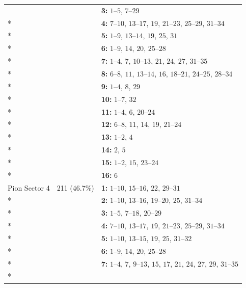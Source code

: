 \begin{longtable}{p{3.5cm}p{2.2cm}p{8.3cm}}
 &  & \textbf{3:} \mbox{$1$--$5$}, \mbox{$7$--$29$} \\*
 &  & \textbf{4:} \mbox{$7$--$10$}, \mbox{$13$--$17$}, \mbox{$19$}, \mbox{$21$--$23$}, \mbox{$25$--$29$}, \mbox{$31$--$34$} \\*
 &  & \textbf{5:} \mbox{$1$--$9$}, \mbox{$13$--$14$}, \mbox{$19$}, \mbox{$25$}, \mbox{$31$} \\*
 &  & \textbf{6:} \mbox{$1$--$9$}, \mbox{$14$}, \mbox{$20$}, \mbox{$25$--$28$} \\*
 &  & \textbf{7:} \mbox{$1$--$4$}, \mbox{$7$}, \mbox{$10$--$13$}, \mbox{$21$}, \mbox{$24$}, \mbox{$27$}, \mbox{$31$--$35$} \\*
 &  & \textbf{8:} \mbox{$6$--$8$}, \mbox{$11$}, \mbox{$13$--$14$}, \mbox{$16$}, \mbox{$18$--$21$}, \mbox{$24$--$25$}, \mbox{$28$--$34$} \\*
 &  & \textbf{9:} \mbox{$1$--$4$}, \mbox{$8$}, \mbox{$29$} \\*
 &  & \textbf{10:} \mbox{$1$--$7$}, \mbox{$32$} \\*
 &  & \textbf{11:} \mbox{$1$--$4$}, \mbox{$6$}, \mbox{$20$--$24$} \\*
 &  & \textbf{12:} \mbox{$6$--$8$}, \mbox{$11$}, \mbox{$14$}, \mbox{$19$}, \mbox{$21$--$24$} \\*
 &  & \textbf{13:} \mbox{$1$--$2$}, \mbox{$4$} \\*
 &  & \textbf{14:} \mbox{$2$}, \mbox{$5$} \\*
 &  & \textbf{15:} \mbox{$1$--$2$}, \mbox{$15$}, \mbox{$23$--$24$} \\*
 &  & \textbf{16:} \mbox{$6$} \\
\addlinespace
Pion Sector 4 & 211 (46.7\%) & \textbf{1:} \mbox{$1$--$10$}, \mbox{$15$--$16$}, \mbox{$22$}, \mbox{$29$--$31$} \\*
 &  & \textbf{2:} \mbox{$1$--$10$}, \mbox{$13$--$16$}, \mbox{$19$--$20$}, \mbox{$25$}, \mbox{$31$--$34$} \\*
 &  & \textbf{3:} \mbox{$1$--$5$}, \mbox{$7$--$18$}, \mbox{$20$--$29$} \\*
 &  & \textbf{4:} \mbox{$7$--$10$}, \mbox{$13$--$17$}, \mbox{$19$}, \mbox{$21$--$23$}, \mbox{$25$--$29$}, \mbox{$31$--$34$} \\*
 &  & \textbf{5:} \mbox{$1$--$10$}, \mbox{$13$--$15$}, \mbox{$19$}, \mbox{$25$}, \mbox{$31$--$32$} \\*
 &  & \textbf{6:} \mbox{$1$--$9$}, \mbox{$14$}, \mbox{$20$}, \mbox{$25$--$28$} \\*
 &  & \textbf{7:} \mbox{$1$--$4$}, \mbox{$7$}, \mbox{$9$--$13$}, \mbox{$15$}, \mbox{$17$}, \mbox{$21$}, \mbox{$24$}, \mbox{$27$}, \mbox{$29$}, \mbox{$31$--$35$} \\*

\end{longtable}

